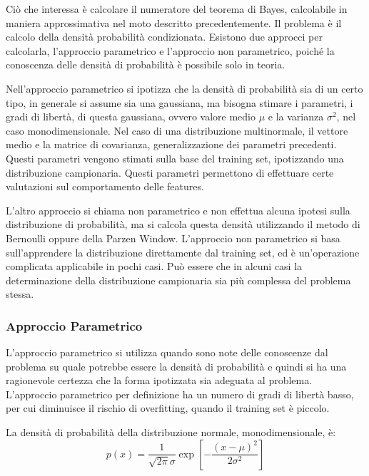 \documentclass{article}
\numberwithin{equation}{subsection}
\begin{document}
Ciò che interessa è calcolare il numeratore del teorema di Bayes, calcolabile in maniera approssimativa nel moto descritto precedentemente. Il problema è il calcolo della densità probabilità condizionata. Esistono due approcci per calcolarla, l'approccio parametrico e l'approccio non parametrico, poiché la conoscenza delle densità di probabilità è possibile solo in teoria. 

Nell'approccio parametrico si ipotizza che la densità di probabilità sia di un certo tipo, 
in generale si assume sia una gaussiana, ma bisogna stimare i parametri, i gradi di libertà, di questa gaussiana, ovvero valore medio $\mu$ e la varianza $\sigma^2$, nel caso monodimensionale. Nel caso di una distribuzione multinormale, 
il vettore medio e la matrice di covarianza, generalizzazione dei parametri precedenti. Questi parametri vengono stimati sulla base del training set, ipotizzando una distribuzione campionaria. 
Questi parametri permettono di effettuare certe valutazioni sul comportamento delle features. 


L'altro approccio si chiama non parametrico e non effettua alcuna ipotesi sulla distribuzione di probabilità, ma si calcola questa densità utilizzando il metodo di Bernoulli oppure della Parzen Window.
L'approccio non parametrico si basa sull'apprendere la distribuzione direttamente dal training set, ed è un'operazione complicata applicabile in pochi casi. Può essere che in alcuni casi la determinazione della distribuzione campionaria sia più complessa del problema stessa. 

\subsubsection{Approccio Parametrico}

L'approccio parametrico si utilizza quando sono note delle conoscenze dal problema su quale potrebbe essere la densità di probabilità e quindi si ha una ragionevole certezza che la forma ipotizzata sia adeguata al problema. L'approccio parametrico per definizione ha un numero di gradi di libertà basso, per cui diminuisce il rischio di overfitting, quando il training set è piccolo. 

La densità di probabilità della distribuzione normale, monodimensionale, è:
\begin{equation*}
    p(x)=\displaystyle\frac{1}{\sqrt{2\pi}\sigma}\exp\left[-\frac{(x-\mu)^2}{2\sigma^2}\right]
\end{equation*}
\end{document}
